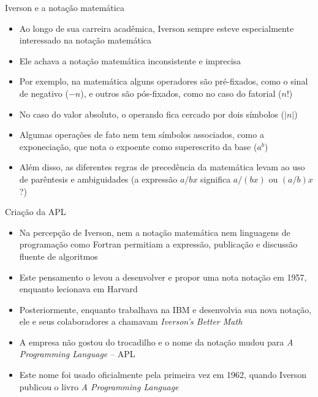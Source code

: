 \begin{frame}[fragile]{Iverson e a notação matemática}

    \begin{itemize}
        \item Ao longo de sua carreira acadêmica, Iverson sempre esteve especialmente interessado na notação matemática 
        \pause

        \item Ele achava a notação matemática inconsistente e imprecisa
        \pause

        \item Por exemplo, na matemática alguns operadores são pré-fixados, como o sinal de negativo ($-n$), e outros são pós-fixados, como no caso do fatorial ($n!$)
        \pause

        \item No caso do valor absoluto, o operando fica cercado por dois símbolos ($|n|$)
        \pause

        \item Algumas operações de fato nem tem símbolos associados, como a exponeciação, que nota o expoente como superescrito da base ($a^b$)
        \pause

        \item Além disso, as diferentes regras de precedência da matemática levam ao uso de parêntesis e ambiguidades (a expressão $a / bx$ significa $a / (bx)$ ou $(a/b)x$?)
    \end{itemize}

\end{frame}

\begin{frame}[fragile]{Criação da APL}

    \begin{itemize}
        \item Na percepção de Iverson, nem a notação matemática nem linguagens de programação como Fortran permitiam a expressão, publicação e discussão fluente de algoritmos 
        \pause

        \item Este pensamento o levou a desenvolver e propor uma nota notação em 1957, enquanto lecionava em Harvard
        \pause

        \item Posteriormente, enquanto trabalhava na IBM e desenvolvia sua nova notação, ele e seus colaboradores a chamavam \textit{Iverson's Better Math}

        \pause
        \item A empresa não gostou do trocadilho e o nome da notação mudou para \textit{A Programming Language} -- APL
        \pause

        \item Este nome foi usado oficialmente pela primeira vez em 1962, quando Iverson publicou o livro \textit{A Programming Language}
    \end{itemize}

\end{frame}

